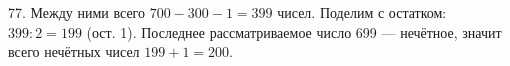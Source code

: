 77. Между ними всего $700-300-1=399$ чисел. Поделим с остатком: $399:2=199$ (ост. 1). Последнее рассматриваемое число 699 --- нечётное, значит всего нечётных чисел $199+1=200.$\\
